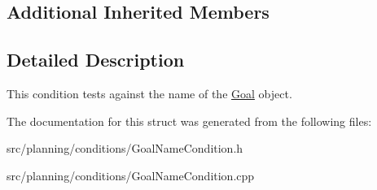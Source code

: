 \subsection*{Additional Inherited Members}


\subsection{Detailed Description}
This condition tests against the name of the \hyperlink{class_goal}{Goal} object. 

The documentation for this struct was generated from the following files\+:\begin{DoxyCompactItemize}
\item 
src/planning/conditions/Goal\+Name\+Condition.\+h\item 
src/planning/conditions/Goal\+Name\+Condition.\+cpp\end{DoxyCompactItemize}
